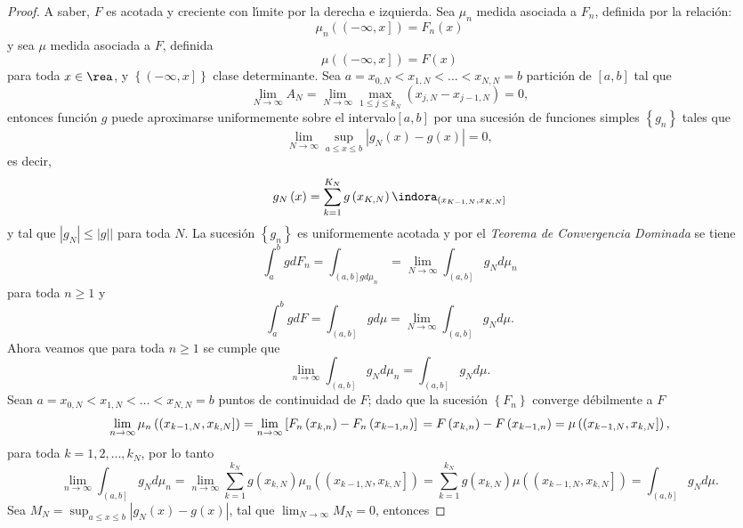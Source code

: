 \begin{proof}
A saber, $F$ es acotada y creciente con l{\'\i}mite por la derecha e izquierda. Sea $\mu_{n}$ medida asociada a $F_{n}$, definida por la relaci\'on:
\[\mu_{n}\left(\left(-\infty,x\right]\right)=F_{n}\left(x\right)\] y sea $\mu$ medida asociada a $F$, definida \[\mu\left(\left(-\infty,x\right]\right)=F\left(x\right)\]
para toda $x \in \rea$, y $\left\{\left(-\infty,x\right]\right\}$
clase determinante. Sea $a=x_{0,N}<x_{1,N}<\ldots<x_{N,N}=b$
partici\'on de $\left[a,b\right]$ tal que
\[\lim_{N\rightarrow \infty}A_{N}=\lim_{N\rightarrow \infty}\max_{1\leq j\leq k_{N}}{\left(x_{j,N}-x_{j-1,N}\right)}=0,\] entonces funci\'on $g$ puede aproximarse uniformemente sobre el intervalo$\left[a,b\right]$ por una sucesi\'on de funciones simples $\left\{g_{n}\right\}$ tales que
\[\lim_{N\rightarrow \infty}\sup_{a\leq x\leq b}|g_{N}\left(x\right)-g\left(x\right)|=0,\] es decir, \[g_{N}\left(x\right)=\sum_{k=1}^{K_{N}}g\left(x_{K,N}\right)\indora_{\left(x_{K-1,N},x_{K,N}\right]}\] y tal que  $|g_{N}|\leq |g||$ para toda $N$. La sucesi\'on $\left\{g_{n}\right\}$ es uniformemente acotada y por el {\em Teorema de Convergencia Dominada} se tiene
\[\int_{a}^{b}gdF_{n}=\int_{\left(a,b\right]gd\mu_{n}}=\lim_{N\rightarrow\infty}\int_{\left(a,b\right]}g_{N}d\mu_{n}\] para toda $n \geq 1$ y
\[\int_{a}^{b}gdF=\int_{\left(a,b\right]}gd\mu=\lim_{N\rightarrow\infty}\int_{\left(a,b\right]}g_{N}d\mu.\] Ahora veamos que para toda $n \geq 1$ se cumple que
\[\lim_{n\rightarrow \infty}\int_{\left(a,b\right]}g_{N}d\mu_{n}=\int_{\left(a,b\right]}g_{N}d\mu.\] Sean $a=x_{0,N}<x_{1,N}<\ldots<x_{N,N}=b$ puntos de continuidad de $F$; dado que la sucesi\'on $\left\{F_{n}\right\}$ converge d\'ebilmente a $F$
\[\lim_{n\rightarrow \infty}\mu_{n}\left(\left(x_{k-1,N},x_{k,N}\right]\right)=\lim_{n \rightarrow \infty} \left[F_{n}\left(x_{k,n}\right)-F_{n}\left(x_{k-1,n}\right)\right] \\
= F\left(x_{k,n}\right)-F\left(x_{k-1,n}\right)
= \mu\left(\left(x_{k-1,N},x_{k,N}\right]\right),\] para toda $k=1,2,\ldots,k_{N}$, por lo tanto
\[\lim_{n\rightarrow\infty}\int_{\left(a,b\right]}g_{N}d\mu_{n}
=\lim_{n\rightarrow\infty}\sum_{k=1}^{k_{N}}g\left(x_{k,N}\right)\mu_{n}\left(\left(x_{k-1,N},x_{k,N}\right]\right)=\sum_{k=1}^{k_{N}}g\left(x_{k,N}\right)\mu\left(\left(x_{k-1,N},x_{k,N}\right]\right)=\int_{\left(a,b\right]}g_{N}d\mu.\] Sea
$M_{N}=\sup_{a\leq x\leq b}|g_{N}\left(x\right)-g\left(x\right)|$, tal que $\lim_{N\rightarrow\infty}M_{N}=0$, entonces

\end{proof}
